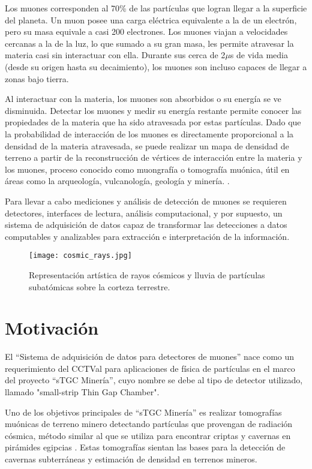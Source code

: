 	Los muones corresponden al 70\% de las partículas que logran llegar a la superficie del planeta. Un muon posee una carga eléctrica equivalente a la de un electrón, pero su masa equivale a casi 200 electrones. Los muones viajan a velocidades cercanas a la de la luz, lo que sumado a su gran masa, les permite atravesar la materia casi sin interactuar con ella. Durante sus cerca de 2$\mu$s de vida media \cite{Tanabashi2018ReviewPhysics} (desde su origen hasta su decaimiento), los muones son incluso capaces de llegar a zonas bajo tierra.
	
	Al interactuar con la materia, los muones son absorbidos o su energía se ve disminuida. Detectar los muones y medir su energía restante permite conocer las propiedades de la materia que ha sido atravesada por estas partículas. Dado que la probabilidad de interacción de los muones es directamente proporcional a la densidad de la materia atravesada, se puede realizar un mapa de densidad de terreno a partir de la reconstrucción de vértices de interacción entre la materia y los muones, proceso conocido como muongrafía o tomografía muónica, útil en áreas como la arqueología, vulcanología, geología y minería. \cite{Rocca2018CosmicUs} \cite{2012HandbookImaging}. 
	
	Para llevar a cabo mediciones y análisis de detección de muones se requieren detectores, interfaces de lectura, análisis computacional, y por supuesto, un sistema de adquisición de datos capaz de transformar las detecciones a datos computables y analizables para extracción e interpretación de la información.
	
	\begin{figure}[h]
		\centering
		\texttt{[image: cosmic\_rays.jpg]}
		\caption{Representación artística de rayos cósmicos y lluvia de partículas subatómicas sobre la corteza terrestre.}
		\label{img:cosmic-ray}
	\end{figure}
	
	
\section{Motivación}
	\label{par:smallwheel}
	El ``Sistema de adquisición de datos para detectores de muones'' nace como un requerimiento del CCTVal para aplicaciones de física de partículas en el marco del proyecto ``sTGC Minería'', cuyo nombre se debe al tipo de detector utilizado, llamado "small-strip Thin Gap Chamber".
	
	Uno de los objetivos principales de ``sTGC Minería'' es realizar tomografías muónicas de terreno minero detectando partículas que provengan de radiación cósmica, método similar al que se utiliza para encontrar criptas y cavernas en pirámides egipcias \cite{AlvarezSearchPyramids}. Estas tomografías sientan las bases para la detección de cavernas subterráneas y estimación de densidad en terrenos mineros.

